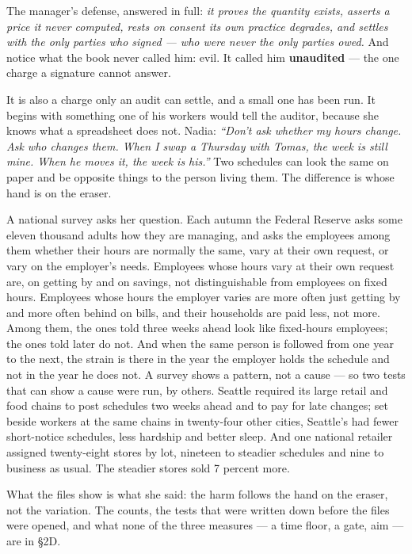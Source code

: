 The manager's defense, answered in full: \emph{it proves the quantity
exists, asserts a price it never computed, rests on consent its own
practice degrades, and settles with the only parties who signed ---
who were never the only parties owed.} And notice what the book never
called him: evil. It called him \textbf{unaudited} --- the one charge a
signature cannot answer.

It is also a charge only an audit can settle, and a small one has been
run. It begins with something one of his workers would tell the
auditor, because she knows what a spreadsheet does not. Nadia: \emph{``Don't
ask whether my hours change. Ask who changes them. When I swap a
Thursday with Tomas, the week is still mine. When he moves it, the
week is his.''} Two schedules can look the same on paper and be
opposite things to the person living them. The difference is whose
hand is on the eraser.

A national survey asks her question. Each autumn the Federal Reserve
asks some eleven thousand adults how they are managing, and asks the
employees among them whether their hours are normally the same, vary
at their own request, or vary on the employer's needs. Employees whose
hours vary at their own request are, on getting by and on savings, not
distinguishable from employees on fixed hours. Employees whose hours
the employer varies are more often just getting by and more often
behind on bills, and their households are paid less, not more. Among
them, the ones told three weeks ahead look like fixed-hours employees;
the ones told later do not. And when the same person is followed from
one year to the next, the strain is there in the year the employer
holds the schedule and not in the year he does not. A survey shows a
pattern, not a cause --- so two tests that can show a cause were run, by
others. Seattle required its large retail and food chains to post
schedules two weeks ahead and to pay for late changes; set beside
workers at the same chains in twenty-four other cities, Seattle's had
fewer short-notice schedules, less hardship and better sleep. And one
national retailer assigned twenty-eight stores by lot, nineteen to
steadier schedules and nine to business as usual. The steadier stores
sold 7 percent more.

What the files show is what she said: the harm follows the hand on
the eraser, not the variation. The counts, the tests that were written
down before the files were opened, and what none of the three
measures --- a time floor, a gate, aim --- are in §2D.

